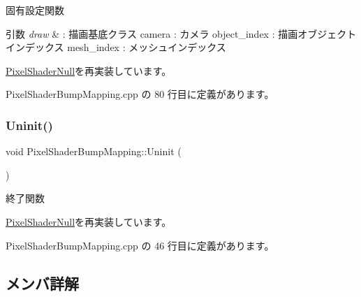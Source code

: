 固有設定関数 


\begin{DoxyParams}{引数}
{\em draw} & \+: 描画基底クラス camera \+: カメラ object\+\_\+index \+: 描画オブジェクトインデックス mesh\+\_\+index \+: メッシュインデックス \\
\hline
\end{DoxyParams}


\mbox{\hyperlink{class_pixel_shader_null_a8dd0194b5a22da5261ab35233a7cfdcd}{Pixel\+Shader\+Null}}を再実装しています。



 Pixel\+Shader\+Bump\+Mapping.\+cpp の 80 行目に定義があります。

\mbox{\label{class_pixel_shader_bump_mapping_a004f731db6dab6b59949baed4a5a32d7}} 
\subsubsection{\texorpdfstring{Uninit()}{Uninit()}}
{\footnotesize\ttfamily void Pixel\+Shader\+Bump\+Mapping\+::\+Uninit (\begin{DoxyParamCaption}{ }\end{DoxyParamCaption})\hspace{0.3cm}{\ttfamily [virtual]}}



終了関数 



\mbox{\hyperlink{class_pixel_shader_null_ae5ee2fa95e5da787918ccbd1877cd0ef}{Pixel\+Shader\+Null}}を再実装しています。



 Pixel\+Shader\+Bump\+Mapping.\+cpp の 46 行目に定義があります。



\subsection{メンバ詳解}
\mbox{\label{class_pixel_shader_bump_mapping_a3c24357ac9611761eece892054847c83}} 
